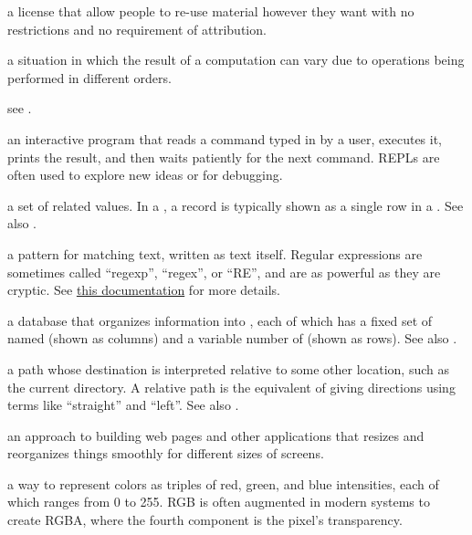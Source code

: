 \begin{description}
a license that allow people to re-use material however they want
with no restrictions and no requirement of attribution.

a situation in which the result of a computation can vary due to operations
being performed in different orders.

see .

an interactive program that reads a command typed in by a user, executes it,
prints the result, and then waits patiently for the next command. REPLs are
often used to explore new ideas or for debugging.

a set of related values. In a ,
a record is typically shown as a single row in a . See also
.

a pattern for matching text, written as text itself. Regular expressions
are sometimes called ``regexp'', ``regex'', or ``RE'', and are as powerful as
they are cryptic. See \href{https://developer.mozilla.org/en-US/docs/Web/JavaScript/Guide/Regular_Expressions}{this documentation} for more details.

a database that organizes information into , each of which
has a fixed set of named  (shown as columns) and a variable
number of  (shown as rows). See also .

a path whose destination is interpreted relative to some other location, such
as the current directory. A relative path is the equivalent of giving
directions using terms like ``straight'' and ``left''. See also .

an approach to building web pages and other applications that resizes and
reorganizes things smoothly for different sizes of screens.

a way to represent colors as triples of red, green, and blue intensities, each
of which ranges from 0 to 255. RGB is often augmented in modern systems to
create RGBA, where the fourth component is the pixel's transparency.


\end{description}
